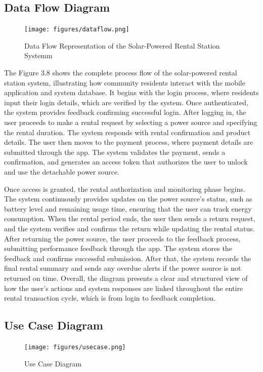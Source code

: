 {\subsection{Data Flow Diagram}
\begin{figure}[H]
	\centering
	\caption{Data Flow Representation of the Solar-Powered Rental Station Systemm}
	\label{fig:data flow}
	\texttt{[image: figures/dataflow.png]}
\end{figure}
	
The Figure 3.8 shows the complete process flow of the solar-powered rental station system, illustrating how community residents interact with the mobile application and system database. It begins with the login process, where residents input their login details, which are verified by the system. Once authenticated, the system provides feedback confirming successful login. After logging in, the user proceeds to make a rental request by selecting a power source and specifying the rental duration. The system responds with rental confirmation and product details. The user then moves to the payment process, where payment details are submitted through the app. The system validates the payment, sends a confirmation, and generates an access token that authorizes the user to unlock and use the detachable power source.

Once access is granted, the rental authorization and monitoring phase begins. The system continuously provides updates on the power source’s status, such as battery level and remaining usage time, ensuring that the user can track energy consumption. When the rental period ends, the user then sends a return request, and the system verifies and confirms the return while updating the rental status. After returning the power source, the user proceeds to the feedback process, submitting performance feedback through the app. The system stores the feedback and confirms successful submission. After that, the system records the final rental summary and sends any overdue alerts if the power source is not returned on time. Overall, the diagram presents a clear and structured view of how the user’s actions and system responses are linked throughout the entire rental transaction cycle, which is from login to feedback completion.

\subsection{Use Case Diagram}
 \begin{figure}[H]
 	\centering
 	\caption{Use Case Diagram}
 	\label{fig:use case}
 	\texttt{[image: figures/usecase.png]}
 \end{figure}
 
}
